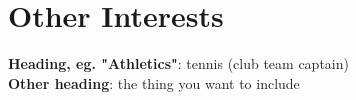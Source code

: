 \documentclass[a4paper,11pt]{article}
\begin{document}
\section{Other Interests}
\begin{itemize}[leftmargin=0.15in, label={}]
    \normalsize{\item{
    \textbf{Heading, eg. "Athletics"}{: {tennis (club team captain)} } \\
    \textbf{Other heading}{: {the thing you want to include} } \\
    }}
\end{itemize}
\end{document}
